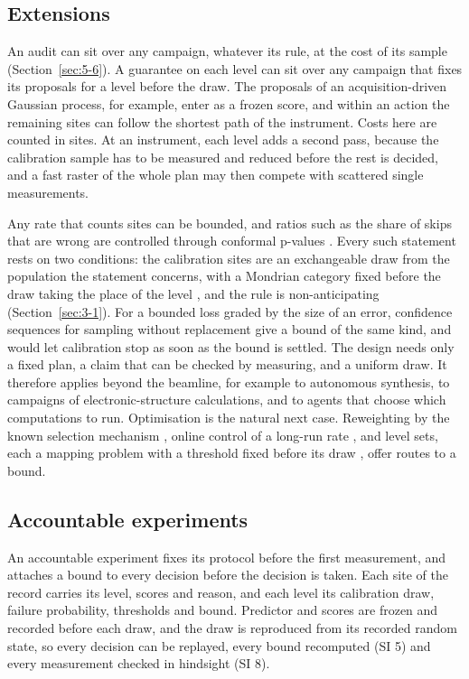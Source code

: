 \documentclass{iopjournal}
\begin{document}
\hypertarget{extensions}{%
\subsection{Extensions}\label{extensions}}

An audit can sit over any campaign, whatever its rule, at the cost of its sample (Section~\ref{sec:5-6}). A guarantee on each level can sit over any campaign that fixes its proposals for a level before the draw. The proposals of an acquisition-driven Gaussian process, for example, enter as a frozen score, and within an action the remaining sites can follow the shortest path of the instrument. Costs here are counted in sites. At an instrument, each level adds a second pass, because the calibration sample has to be measured and reduced before the rest is decided, and a fast raster of the whole plan may then compete with scattered single measurements.

Any rate that counts sites can be bounded, and ratios such as the share of skips that are wrong are controlled through conformal p-values \cite{Jin2023}. Every such statement rests on two conditions: the calibration sites are an exchangeable draw from the population the statement concerns, with a Mondrian category fixed before the draw taking the place of the level \cite{Vovk2005}, and the rule is non-anticipating (Section~\ref{sec:3-1}). For a bounded loss graded by the size of an error, confidence sequences for sampling without replacement \cite{WaudbySmith2020} give a bound of the same kind, and would let calibration stop as soon as the bound is settled. The design needs only a fixed plan, a claim that can be checked by measuring, and a uniform draw. It therefore applies beyond the beamline, for example to autonomous synthesis, to campaigns of electronic-structure calculations, and to agents that choose which computations to run. Optimisation is the natural next case. Reweighting by the known selection mechanism \cite{Tibshirani2019,Fannjiang2022,Barber2023}, online control of a long-run rate \cite{Gibbs2021}, and level sets, each a mapping problem with a threshold fixed before its draw \cite{CerouGuyader2007,Gotovos2013}, offer routes to a bound.

\hypertarget{accountable-experiments}{%
\subsection{Accountable experiments}\label{accountable-experiments}}

An accountable experiment fixes its protocol before the first measurement, and attaches a bound to every decision before the decision is taken. Each site of the record carries its level, scores and reason, and each level its calibration draw, failure probability, thresholds and bound. Predictor and scores are frozen and recorded before each draw, and the draw is reproduced from its recorded random state, so every decision can be replayed, every bound recomputed (SI 5) and every measurement checked in hindsight (SI 8).
\end{document}
